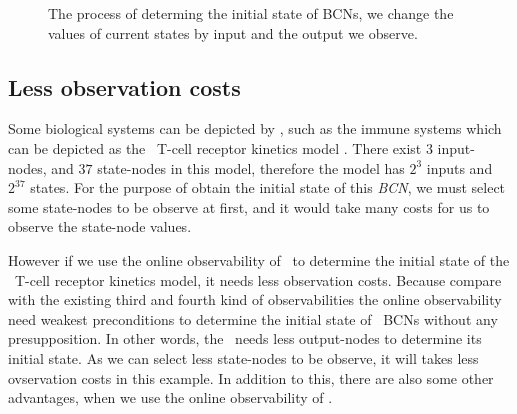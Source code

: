 \begin{figure}[thpb]
      \centering
      
      \caption{The process of determing the initial state of BCNs, we change the values of current states by input and the output we observe. }
      \label{fig:5}
   \end{figure}
\subsection{Less observation costs}
Some biological systems can be depicted by \BCNs, such as the immune systems which can be depicted as the \BCN\ T-cell receptor kinetics model \cite{Klamt2006A}. There exist $3$ input-nodes, and $37$ state-nodes in this model, therefore the model has $2^3$ inputs and $2^{37}$ states. For the purpose of obtain the initial state of this {\em BCN}, we must select some state-nodes to be observe at first, and it would take many costs for us to observe the state-node values.

However if we use the online observability of \BCNs\ to determine the initial state of the \BCN\ T-cell receptor kinetics model, it needs less observation costs. Because compare with the existing third and fourth kind of observabilities the online observability need weakest preconditions to determine the initial state of {\ BCNs} without any presupposition. In other words, the \BCNs\ needs less output-nodes to determine its initial state. As we can select less state-nodes to be observe, it will takes less ovservation costs in this example. In addition to this, there are also some other advantages, when we use the online observability of \BCNs.

